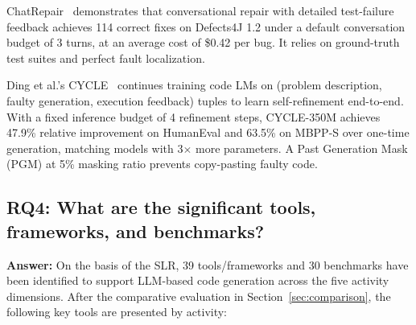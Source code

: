\documentclass[10pt,a4paper]{article}
\begin{document}
ChatRepair~\cite{xia2024chatrepair} demonstrates that conversational repair with detailed test-failure feedback achieves 114 correct fixes on Defects4J 1.2 under a default conversation budget of 3 turns, at an average cost of \$0.42 per bug. It relies on ground-truth test suites and perfect fault localization.

Ding et al.'s CYCLE~\cite{ding2024cycle} continues training code LMs on (problem description, faulty generation, execution feedback) tuples to learn self-refinement end-to-end. With a fixed inference budget of 4 refinement steps, CYCLE-350M achieves 47.9\% relative improvement on HumanEval and 63.5\% on MBPP-S over one-time generation, matching models with 3$\times$ more parameters. A Past Generation Mask (PGM) at 5\% masking ratio prevents copy-pasting faulty code.

\subsection*{RQ4: What are the significant tools, frameworks, and benchmarks?}
\textbf{Answer:} On the basis of the SLR, 39 tools/frameworks and 30 benchmarks have been identified to support LLM-based code generation across the five activity dimensions. After the comparative evaluation in Section~\ref{sec:comparison}, the following key tools are presented by activity:
\end{document}
